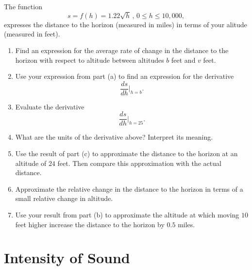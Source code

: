 \documentclass{ximera}
\begin{document}
\begin{question} \label{Qdggbrgthghghb}
The function
\[
      s = f(h) = 1.22\sqrt{h} \, , \, 0\leq h \leq 10,000 ,
\]
expresses the distance to the horizon (measured in miles) in terms of your alitude (measured in feet).

\begin{enumerate}
\item Find an expression for the average rate of change in the distance to the horizon with respect to altitude between altitudes $b$ feet and $v$ feet.

\item Use your expression from part (a) to find an expression for the derivative 
\[
    \frac{ds}{dh}\Big|_{h=b}.
\]

\item Evaluate the derivative 
\[
       \frac{ds}{dh}\Big|_{h=25} .
\]

\item What are the units of the derivative above? Interpret its meaning.

\item Use the result of part (c) to approximate the distance to the horizon at an altitude of $24$ feet. Then compare this approximation with the actual distance.

\item Approximate the relative change in the distance to the horizon in terms of a small relative change in altitude.

\item Use your result from part (b) to approximate the altitude at which moving $10$ feet higher increase the distance to the horizon by $0.5$ miles.

\end{enumerate}
\end{question}




\section{Intensity of Sound}
\end{document}
